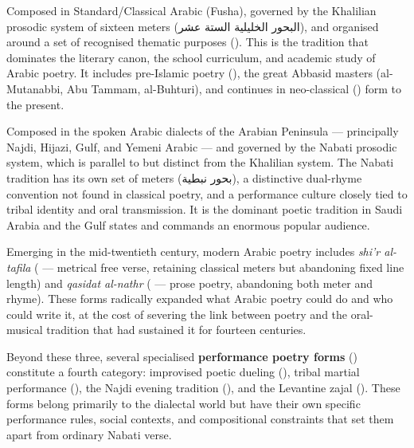 \begin{description}[leftmargin=2cm, style=nextline]
  \item[\textbf{Classical Arabic Poetry} (\ar{الشعر العربي الفصيح})]
    Composed in Standard/Classical Arabic (Fusha), governed by the Khalilian prosodic system of sixteen meters (البحور الخليلية الستة عشر), and organised around a set of recognised thematic purposes (). This is the tradition that dominates the literary canon, the school curriculum, and academic study of Arabic poetry. It includes pre-Islamic poetry (), the great Abbasid masters (al-Mutanabbi, Abu Tammam, al-Buhturi), and continues in neo-classical () form to the present.

  \item[\textbf{Dialectal / Nabati Poetry} (\ar{الشعر العامي / الشعر النبطي})]
    Composed in the spoken Arabic dialects of the Arabian Peninsula — principally Najdi, Hijazi, Gulf, and Yemeni Arabic — and governed by the Nabati prosodic system, which is parallel to but distinct from the Khalilian system. The Nabati tradition has its own set of meters (بحور نبطية), a distinctive dual-rhyme convention not found in classical poetry, and a performance culture closely tied to tribal identity and oral transmission. It is the dominant poetic tradition in Saudi Arabia and the Gulf states and commands an enormous popular audience.

  \item[\textbf{Modern Forms} (\ar{الأشكال الشعرية الحديثة})]
    Emerging in the mid-twentieth century, modern Arabic poetry includes \textit{shi'r al-tafila} ( — metrical free verse, retaining classical meters but abandoning fixed line length) and \textit{qasidat al-nathr} ( — prose poetry, abandoning both meter and rhyme). These forms radically expanded what Arabic poetry could do and who could write it, at the cost of severing the link between poetry and the oral-musical tradition that had sustained it for fourteen centuries.
\end{description}

Beyond these three, several specialised \textbf{performance poetry forms} () constitute a fourth category: improvised poetic dueling (), tribal martial performance (), the Najdi evening tradition (), and the Levantine zajal (). These forms belong primarily to the dialectal world but have their own specific performance rules, social contexts, and compositional constraints that set them apart from ordinary Nabati verse.

